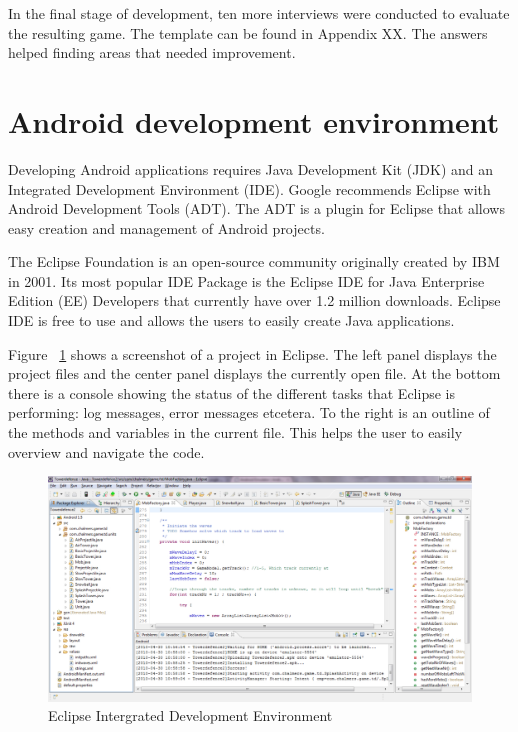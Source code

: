In the final stage of development, ten more interviews were conducted to evaluate the resulting game. The template can be found in Appendix XX. The answers helped finding areas that needed improvement.
\section{Android development environment}

Developing Android applications requires Java Development Kit (JDK) and an Integrated Development Environment (IDE). Google recommends Eclipse with Android Development Tools (ADT). The ADT is a plugin for Eclipse that allows easy creation and management of Android projects. \citep{Android}

The Eclipse Foundation is an open-source community originally created by IBM in 2001. Its most popular IDE Package is the Eclipse IDE for Java Enterprise Edition (EE) Developers that currently have over 1.2 million downloads. Eclipse IDE is free to use and allows the users to easily create Java applications. \citep{Eclipse}

Figure ~\ref{fig:eclipseIDE} shows a screenshot of a project in Eclipse. The left panel displays the project files and the center panel displays the currently open file. At the bottom there is a console showing the status of the different tasks that Eclipse is performing: log messages, error messages etcetera. To the right is an outline of the methods and variables in the current file. This helps the user to easily overview and navigate the code.

\begin{figure}[here]
\begin{center}
\includegraphics[scale=0.3]{pics/chapters/chapter2/eclipse}
\end{center}
\caption{Eclipse Intergrated Development Environment}
\label{fig:eclipseIDE}
\end{figure}

